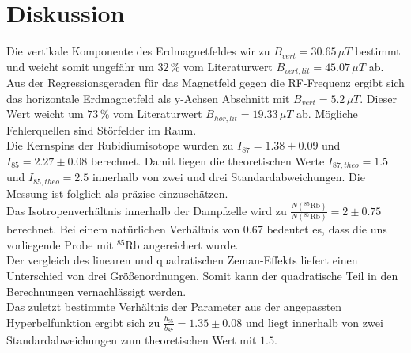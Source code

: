 \section{Diskussion}
\label{sec:Diskussion}
Die vertikale Komponente des Erdmagnetfeldes wir zu $B_{vert}=30.65\,\mu T$ bestimmt 
und weicht somit ungefähr um $32\,\%$ vom Literaturwert $B_{vert,lit}=45.07\,\mu T$ ab.
Aus der Regressionsgeraden für das Magnetfeld gegen die RF-Frequenz ergibt sich das horizontale Erdmagnetfeld als y-Achsen Abschnitt mit $B_{vert}=5.2\,\mu T$.
Dieser Wert weicht um $73\,\%$ vom Literaturwert $B_{hor,lit}=19.33\,\mu T$ ab.
Mögliche Fehlerquellen sind Störfelder im Raum.
\\
Die Kernspins der Rubidiumisotope wurden zu $I_{87} = 1.38\pm0.09$ und $I_{85} = 2.27\pm0.08$ berechnet.
Damit liegen die theoretischen Werte $I_{87,theo} = 1.5$ und $I_{85,theo} = 2.5$ innerhalb von zwei und drei Standardabweichungen.
Die Messung ist folglich als präzise einzuschätzen.
\\
Das Isotropenverhältnis innerhalb der Dampfzelle wird zu $\frac{N\left(^{85}\text{Rb}\right)}{N\left(^{87}\text{Rb}\right)}=2\pm0.75$ berechnet.
Bei einem natürlichen Verhältnis von $0.67$ bedeutet es, dass die uns vorliegende Probe mit $^{85}\text{Rb}$ angereichert wurde.
\\
Der vergleich des linearen und quadratischen Zeman-Effekts liefert einen Unterschied von drei Größenordnungen.
Somit kann der quadratische Teil in den Berechnungen vernachlässigt werden.
\\
Das zuletzt bestimmte Verhältnis der Parameter aus der angepassten Hyperbelfunktion ergibt sich zu $\frac{b_85}{b_87}=1.35\pm0.08$ und liegt innerhalb von zwei Standardabweichungen zum theoretischen Wert mit $1.5$. 